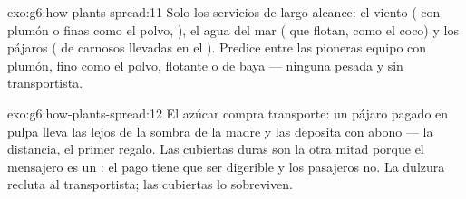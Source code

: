 \begin{solution}{exo:g6:how-plants-spread:11}
Solo los servicios de largo alcance: el viento ( con plumón o
finas como el polvo, ), el agua del mar ( que flotan, como
el coco) y los pájaros ( de  carnosos llevadas en el ). Predice entre las pioneras equipo con plumón, fino como el
polvo, flotante o de baya --- ninguna  pesada y sin
transportista.
\end{solution}

\begin{solution}{exo:g6:how-plants-spread:12}
El azúcar compra transporte: un pájaro pagado en pulpa lleva las
 lejos de la sombra de la madre y las deposita con abono ---
la distancia, el primer regalo. Las cubiertas duras son la otra mitad
porque el mensajero es un : el pago tiene que ser
digerible y los pasajeros no. La dulzura recluta al transportista; las
cubiertas lo sobreviven.
\end{solution}

